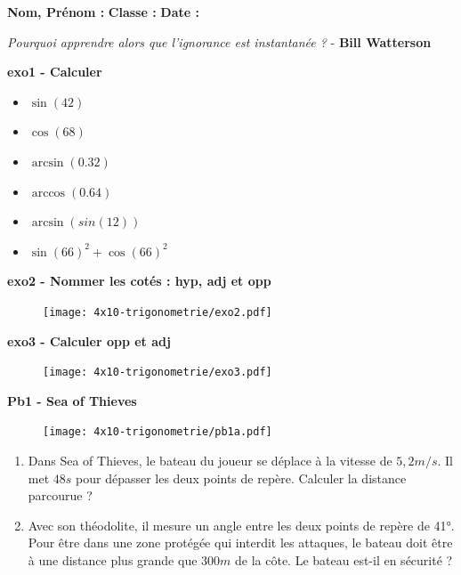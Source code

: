 



\textbf{Nom, Prénom :} \hspace{8cm} \textbf{Classe :} \hspace{3cm} \textbf{Date :}\\

\vspace{-0.5cm} \begin{center}
  \textit{Pourquoi apprendre alors que l’ignorance est instantanée ?}  - \textbf{ Bill Watterson}
\end{center}

\textbf{exo1 - Calculer}

\begin{multicols}{3}
\begin{itemize}[label={$\bullet$}]
  \item $\sin(42)$ \dotfill 
  \item $\cos(68)$ \dotfill \columnbreak
  \item $\arcsin(0.32)$ \dotfill 
  \item $\arccos(0.64)$ \dotfill \columnbreak
  \  \item $\arcsin(sin(12))$ \dotfill 
  \item $\sin(66)^2 + \cos(66)^2 $ \dotfill 
\end{itemize} 
\end{multicols}

\textbf{exo2 - Nommer les cotés : hyp, adj et opp}

\begin{figure}[H]
  \centering
  \texttt{[image: 4x10-trigonometrie/exo2.pdf]}
\end{figure}

\textbf{exo3 - Calculer opp et adj}

\begin{figure}[H]
  \centering
  \texttt{[image: 4x10-trigonometrie/exo3.pdf]}
\end{figure}

\Pointilles[3]

\begin{multicols}{2}

\textbf{Pb1 - Sea of Thieves}

\begin{figure}[H]
  \centering
  \texttt{[image: 4x10-trigonometrie/pb1a.pdf]}
\end{figure}

\begin{enumerate}
  \item Dans Sea of Thieves, le bateau du joueur se déplace à la vitesse de $5,2m/s$. Il met $48s$ pour dépasser les deux points de repère. Calculer la distance parcourue ?
  \item Avec son théodolite, il mesure un angle entre les deux points de repère de 41°. Pour être dans une zone protégée qui interdit les attaques, le bateau doit être à une distance plus grande que $300m$ de la côte. Le bateau est-il en sécurité ?
\end{enumerate} \columnbreak

\Pointilles[17]

\end{multicols}

